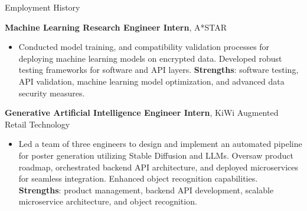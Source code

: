 \begin{rubric}{Employment History}

    \textbf{Machine Learning Research Engineer Intern}, A*STAR\par
    \begin{itemize}
        \item Conducted model training, and compatibility validation processes for deploying machine learning models on encrypted data. Developed robust testing frameworks for software and API layers. \textbf{Strengths}: software testing, API validation, machine learning model optimization, and advanced data security measures.
    \end{itemize}

    \textbf{Generative Artificial Intelligence Engineer Intern}, KiWi Augmented Retail Technology\par
    \begin{itemize}
        \item Led a team of three engineers to design and implement an automated pipeline for poster generation utilizing Stable Diffusion and LLMs. Oversaw product roadmap, orchestrated backend API architecture, and deployed microservices for seamless integration. Enhanced object recognition capabilities. \textbf{Strengths}: product management, backend API development, scalable microservice architecture, and object recognition.
    \end{itemize}

\end{rubric}
